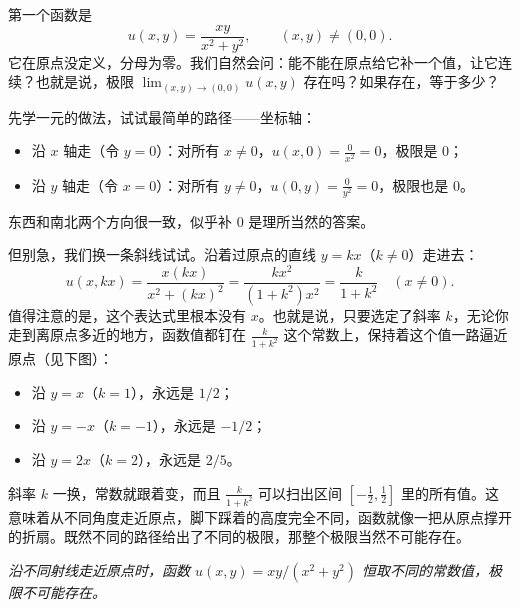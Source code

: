 第一个函数是
\[
u(x,y)=\frac{xy}{x^2+y^2},\qquad (x,y)\neq(0,0).
\]
它在原点没定义，分母为零。我们自然会问：能不能在原点给它补一个值，让它连续？也就是说，极限 \(\displaystyle\lim_{(x,y)\to(0,0)}u(x,y)\) 存在吗？如果存在，等于多少？

先学一元的做法，试试最简单的路径——坐标轴：
\begin{itemize}
    \item 沿 \(x\) 轴走（令 \(y=0\)）：对所有 \(x\neq0\)，\(u(x,0)=\frac{0}{x^2}=0\)，极限是 \(0\)；
    \item 沿 \(y\) 轴走（令 \(x=0\)）：对所有 \(y\neq0\)，\(u(0,y)=\frac{0}{y^2}=0\)，极限也是 \(0\)。
\end{itemize}
东西和南北两个方向很一致，似乎补 \(0\) 是理所当然的答案。

但别急，我们换一条斜线试试。沿着过原点的直线 \(y=kx\)（\(k\neq0\)）走进去：
\[
u(x,kx)=\frac{x(kx)}{x^2+(kx)^2}=\frac{kx^2}{(1+k^2)x^2}=\frac{k}{1+k^2}\quad (x\neq0).
\]
值得注意的是，这个表达式里根本没有 \(x\)。也就是说，只要选定了斜率 \(k\)，无论你走到离原点多近的地方，函数值都钉在 \(\frac{k}{1+k^2}\) 这个常数上，保持着这个值一路逼近原点（见下图）：
\begin{itemize}
    \item 沿 \(y=x\)（\(k=1\)），永远是 \(1/2\)；
    \item 沿 \(y=-x\)（\(k=-1\)），永远是 \(-1/2\)；
    \item 沿 \(y=2x\)（\(k=2\)），永远是 \(2/5\)。
\end{itemize}
斜率 \(k\) 一换，常数就跟着变，而且 \(\frac{k}{1+k^2}\) 可以扫出区间 \([-\frac12,\frac12]\) 里的所有值。这意味着从不同角度走近原点，脚下踩着的高度完全不同，函数就像一把从原点撑开的折扇。既然不同的路径给出了不同的极限，那整个极限当然不可能存在。

\begin{center}

\emph{沿不同射线走近原点时，函数 \(u(x,y)=xy/(x^2+y^2)\) 恒取不同的常数值，极限不可能存在。}
\end{center}

